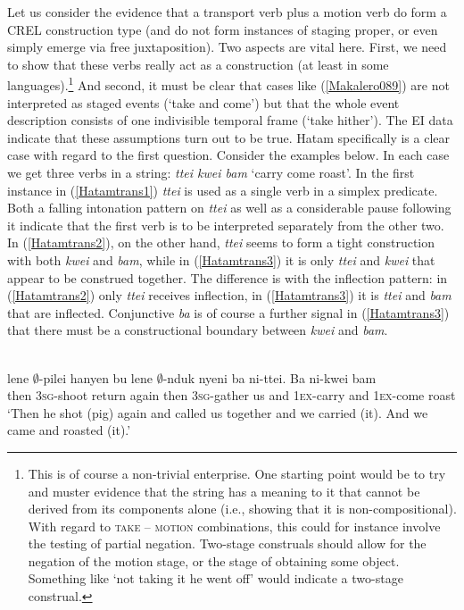 Let us consider the evidence that a transport verb plus a motion verb do form a CREL construction type (and do not form instances of staging proper, or even simply emerge via free juxtaposition). Two aspects are vital here. First, we need to show that these verbs really act as a construction (at least in some languages).\footnote{This is of course a non-trivial enterprise. One starting point would be to try and muster evidence that the string has a meaning to it that cannot be derived from its components alone (i.e., showing that it is non-compositional). With regard to \textsc{take} -- \textsc{motion} combinations, this could for instance involve the testing of partial negation. Two-stage construals should allow for the negation of the motion stage, or the stage of obtaining some object. Something like `not taking it he went off' would indicate a two-stage construal.} And second, it must be clear that cases like (\ref{Makalero089}) are not interpreted as staged events (`take and come') but that the whole event description consists of one indivisible temporal frame (`take hither'). The EI data indicate that these assumptions turn out to be true. Hatam specifically is a clear case with regard to the first question. Consider the examples below. In each case we get three verbs in a string: \textit{ttei kwei bam} `carry come roast'. In the first instance in (\ref{Hatamtrans1}) \textit{ttei} is used as a single verb in a simplex predicate. Both a falling intonation pattern on \textit{ttei} as well as a considerable pause following it indicate that the first verb is to be interpreted separately from the other two. In (\ref{Hatamtrans2}), on the other hand, \textit{ttei} seems to form a tight construction with both \textit{kwei} and \textit{bam}, while in (\ref{Hatamtrans3}) it is only \textit{ttei} and \textit{kwei} that appear to be construed together. The difference is with the inflection pattern: in (\ref{Hatamtrans2}) only \textit{ttei} receives inflection, in (\ref{Hatamtrans3}) it is \textit{ttei} and \textit{bam} that are inflected. Conjunctive \textit{ba} is of course a further signal in (\ref{Hatamtrans3}) that there must be a constructional boundary between \textit{kwei} and \textit{bam}.

\a \label{Hatamtrans1}
\\
\gll lene $\emptyset$-pilei hanyen bu lene $\emptyset$-nduk nyeni ba ni-ttei. Ba ni-kwei bam \\
then \textsc{3}\textsc{sg}-shoot return again then \textsc{3}\textsc{sg}-gather us and \textsc{1}\textsc{ex}-carry and \textsc{1}\textsc{ex}-come roast \\
\glft `Then he shot (pig) again and called us together and we carried (it). And we came and roasted (it).' \\
\z

